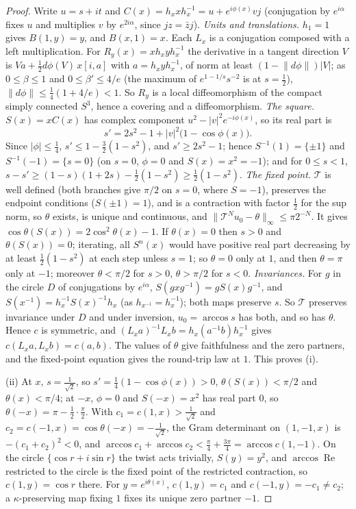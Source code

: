 \documentclass[11pt,reqno]{amsart}
\theoremstyle{definition}
\theoremstyle{remark}
\numberwithin{equation}{section}
\newcommand{\re}{\operatorname{Re}}
\begin{document}
\begin{proof}
Write $u=s+it$ and $C(x)=h_xxh_x^{-1}=u+e^{i\phi(x)}vj$ (conjugation by $e^{i\alpha}$ fixes $u$ and multiplies $v$ by $e^{2i\alpha}$, since $jz=\bar zj$).
\emph{Units and translations.}  $h_1=1$ gives $B(1,y)=y$, and $B(x,1)=x$.  Each $L_x$ is a conjugation composed with a left
multiplication.  For $R_y(x)=xh_xyh_x^{-1}$ the derivative in a tangent direction $V$ is $Va+\frac12d\phi(V)\,x[i,a]$ with $a=h_xyh_x^{-1}$, of norm at
least $(1-\lVert d\phi\rVert)\lvert V\rvert$; as $0\le\beta\le1$ and $0\le\beta'\le4/e$ (the maximum of $e^{1-1/s}s^{-2}$ is at $s=\frac12$),
$\lVert d\phi\rVert\le\frac14(1+4/e)<1$.  So $R_y$ is a local diffeomorphism of the compact simply connected $S^3$, hence a covering and a
diffeomorphism.  \emph{The square.}  $S(x)=xC(x)$ has complex component $u^2-\lvert v\rvert^2e^{-i\phi(x)}$, so its real part is
\[
s'=2s^2-1+\lvert v\rvert^2\bigl(1-\cos\phi(x)\bigr).
\]
Since $\lvert\phi\rvert\le\frac14$, $s'\le1-\frac32(1-s^2)$, and $s'\ge2s^2-1$; hence $S^{-1}(1)=\{\pm1\}$ and $S^{-1}(-1)=\{s=0\}$ (on $s=0$, $\phi=0$ and $S(x)=x^2=-1$);
and for $0\le s<1$, $s-s'\ge(1-s)(1+2s)-\frac12(1-s^2)\ge\frac12(1-s^2)$.  \emph{The fixed point.}  $\mathcal T$ is well defined (both branches give $\pi/2$
on $s=0$, where $S=-1$), preserves the endpoint conditions ($S(\pm1)=1$), and is a contraction with factor $\frac12$ for the sup norm, so
$\theta$ exists, is unique and continuous, and $\lVert\mathcal T^Nu_0-\theta\rVert_\infty\le\pi2^{-N}$.  It gives $\cos\theta(S(x))=2\cos^2\theta(x)-1$.  If
$\theta(x)=0$ then $s>0$ and $\theta(S(x))=0$; iterating, all $S^n(x)$ would have positive real part decreasing by at least $\frac12(1-s^2)$ at each
step unless $s=1$; so $\theta=0$ only at $1$, and then $\theta=\pi$ only at $-1$; moreover $\theta<\pi/2$ for $s>0$, $\theta>\pi/2$ for $s<0$.
\emph{Invariances.}  For $g$ in the circle $D$ of conjugations by $e^{i\alpha}$, $S(gxg^{-1})=gS(x)g^{-1}$, and $S(x^{-1})=h_x^{-1}S(x)^{-1}h_x$ (as
$h_{x^{-1}}=h_x^{-1}$); both maps preserve $s$.  So $\mathcal T$ preserves invariance under $D$ and under inversion, $u_0=\arccos s$ has both, and so
has $\theta$.  Hence $c$ is symmetric, and $(L_xa)^{-1}L_xb=h_x(a^{-1}b)h_x^{-1}$ gives $c(L_xa,L_xb)=c(a,b)$.  The values of $\theta$ give faithfulness and
the zero partners, and the fixed-point equation gives the round-trip law at $1$.  This proves (i).

(ii) At $x$, $s=\frac1{\sqrt2}$, so $s'=\frac14(1-\cos\phi(x))>0$, $\theta(S(x))<\pi/2$ and $\theta(x)<\pi/4$; at $-x$, $\phi=0$ and $S(-x)=x^2$ has real part $0$,
so $\theta(-x)=\pi-\frac12\cdot\frac\pi2$.  With $c_1=c(1,x)>\frac1{\sqrt2}$ and $c_2=c(-1,x)=\cos\theta(-x)=-\frac1{\sqrt2}$, the Gram determinant on $(1,-1,x)$ is
$-(c_1+c_2)^2<0$, and $\arccos c_1+\arccos c_2<\frac\pi4+\frac{3\pi}4=\arccos c(1,-1)$.  On the circle $\{\cos r+i\sin r\}$ the twist acts trivially, $S(y)=y^2$, and
$\arccos\re$ restricted to the circle is the fixed point of the restricted contraction, so $c(1,y)=\cos r$ there.  For $y=e^{i\theta(x)}$,
$c(1,y)=c_1$ and $c(-1,y)=-c_1\ne c_2$; a $\kappa$-preserving map fixing $1$ fixes its unique zero partner $-1$.


\end{proof}
\end{document}
